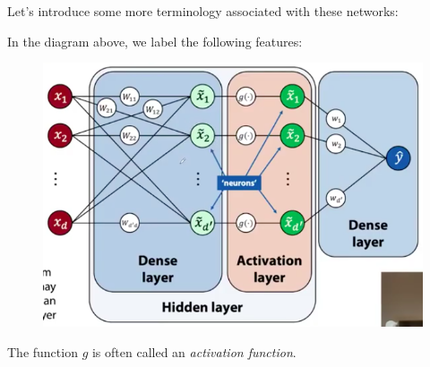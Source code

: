 Let's introduce some more terminology associated with these networks:
\begin{framedef}
In the diagram above, we label the following features:
\begin{figure}[H]
\centering
\includegraphics[scale=0.4]{labelledbasicnetwork.png}
\end{figure}
The function $g$ is often called an \textit{activation function}.
\end{framedef}



\newpage
